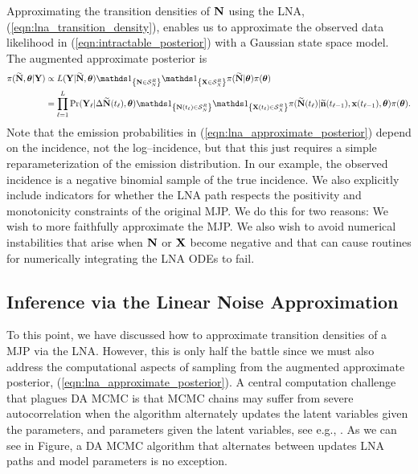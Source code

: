 Approximating the transition densities of $ \mathbf{N} $ using the LNA, (\ref{eqn:lna_transition_density}), enables us to approximate the observed data likelihood in (\ref{eqn:intractable_posterior}) with a Gaussian state space model. The augmented approximate posterior is
\begin{align}
\label{eqn:lna_approximate_posterior}
\pi(\bNtil,\btheta|\bY) &\propto L(\bY|\bNtil,\btheta)\ind{\bN\in\mcS_N^R}\ind{\bX\in\mcS_X^R}\pi(\bNtil|\btheta)\pi(\btheta) \nonumber\\
&= \prod_{\ell=1}^{L}\Pr(\bY_\ell|\Delta\bNtil(t_\ell),\btheta)\ind{\bN(t_\ell)\in\mcS_N^R}\ind{\bX(t_\ell)\in\mcS_X^R}\pi(\bNtil(t_\ell)|\bntil(t_{\ell-1}),\bx(t_{\ell-1}),\btheta)\pi(\btheta).
\end{align}
Note that the emission probabilities in (\ref{eqn:lna_approximate_posterior}) depend on the incidence, not the log--incidence, but that this just requires a simple reparameterization of the emission distribution. In our example, the observed incidence is a negative binomial sample of the true incidence. We also explicitly include indicators for whether the LNA path respects the positivity and monotonicity constraints of the original MJP. We do this for two reasons: We wish to more faithfully approximate the MJP. We also wish to avoid numerical instabilities that arise when $ \mathbf{N} $ or $ \mathbf{X} $ become negative and that can cause routines for numerically integrating the LNA ODEs to fail. 

\subsection{Inference via the Linear Noise Approximation}
\label{subsec:lna_inference}

To this point, we have discussed how to approximate transition densities of a MJP via the LNA. However, this is only half the battle since we must also address the computational aspects of sampling from the augmented approximate posterior, (\ref{eqn:lna_approximate_posterior}). A central computation challenge that plagues DA MCMC is that MCMC chains may suffer from severe autocorrelation when the algorithm alternately updates the latent variables given the parameters, and parameters given the latent variables, see e.g., \cite{bernardo2003non,papaspiliopoulos2003noncentered,papaspiliopoulos2007general,yu2011center}. As we can see in Figure, a DA MCMC algorithm that alternates between updates LNA paths and model parameters is no exception.


